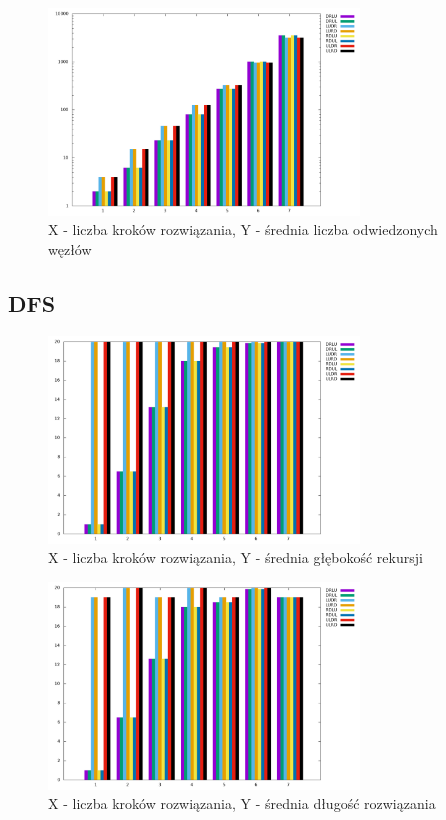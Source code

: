 \documentclass{classrep}
\begin{document}
{{            \begin{figure}[!htbp]
                \centering
                \includegraphics[width=\textwidth, height=55mm]{img/BFS_visited.png}
                \caption{X - liczba kroków rozwiązania, Y - średnia liczba odwiedzonych węzłów}
                \label{BFS_visited}
            \end{figure}
            \FloatBarrier
        }

        \subsection{DFS} {
            \begin{figure}[!htbp]
                \centering
                \includegraphics[width=\textwidth, height=55mm]{img/DFS_depth.png}
                \caption{X - liczba kroków rozwiązania, Y - średnia głębokość rekursji}
                \label{DFS_depth}
            \end{figure}

            \begin{figure}[!htbp]
                \centering
                \includegraphics[width=\textwidth, height=55mm]{img/DFS_length.png}
                \caption{X - liczba kroków rozwiązania, Y - średnia długość rozwiązania}
                \label{DFS_length}
            \end{figure}

}}
\end{document}
